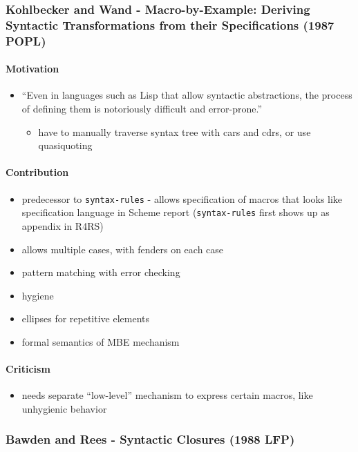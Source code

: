 \documentclass[12pt]{article}	%
\begin{document}
\subsubsection*{Kohlbecker and Wand - Macro-by-Example: Deriving Syntactic Transformations from their Specifications (1987 POPL)}

\paragraph{Motivation}
\begin{itemize}
	\item ``Even in languages such as Lisp that allow syntactic abstractions, the process of defining them is notoriously difficult and error-prone.''
	\begin{itemize}
		\item have to manually traverse syntax tree with cars and cdrs, or use quasiquoting
	\end{itemize}
\end{itemize}
\paragraph{Contribution}
\begin{itemize}
	\item predecessor to \verb!syntax-rules! - allows specification of macros that looks like specification language in Scheme report (\verb!syntax-rules! first shows up as appendix in R4RS)
	\item allows multiple cases, with fenders on each case
	\item pattern matching with error checking
	\item hygiene
	\item ellipses for repetitive elements
	\item formal semantics of MBE mechanism
\end{itemize}
\paragraph{Criticism}
\begin{itemize}
	\item needs separate ``low-level'' mechanism to express certain macros, like unhygienic behavior
\end{itemize}

\subsubsection*{Bawden and Rees - Syntactic Closures (1988 LFP)}
\end{document}
